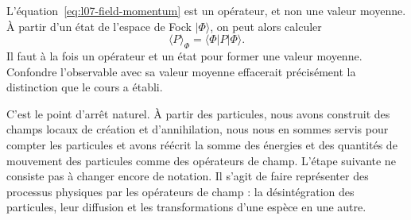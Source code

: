 L’équation~\eqref{eq:l07-field-momentum} est un opérateur, et non une valeur moyenne. À partir d’un état de l’espace de Fock \(|\Phi\rangle\), on peut alors calculer
\begin{equation}
\langle P\rangle_\Phi=\langle\Phi|P|\Phi\rangle.
\end{equation}
Il faut à la fois un opérateur et un état pour former une valeur moyenne. Confondre l’observable avec sa valeur moyenne effacerait précisément la distinction que le cours a établi.

\begin{classroomqa}
\end{classroomqa}

C’est le point d’arrêt naturel. À partir des particules, nous avons construit des champs locaux de création et d’annihilation, nous nous en sommes servis pour compter les particules et avons réécrit la somme des énergies et des quantités de mouvement des particules comme des opérateurs de champ. L’étape suivante ne consiste pas à changer encore de notation. Il s’agit de faire représenter des processus physiques par les opérateurs de champ : la désintégration des particules, leur diffusion et les transformations d’une espèce en une autre.